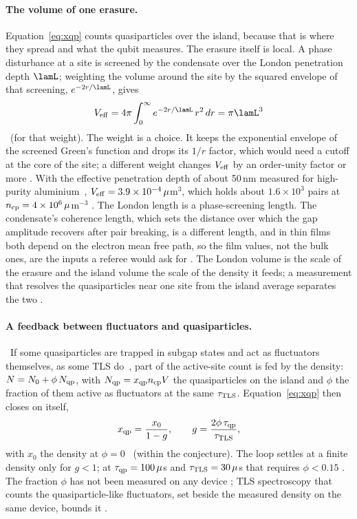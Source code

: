 \paragraph{The volume of one erasure.} Equation~\eqref{eq:xqp} counts quasiparticles over the island, because that is where they
spread and what the qubit measures. The erasure itself is local. A phase disturbance at a site is screened by the condensate over the
London penetration depth $\lamL$; weighting the volume around the site by the squared envelope of that screening, $e^{-2r/\lamL}$,
gives
\begin{equation}V_{\rm eff}=4\pi\int_0^\infty e^{-2r/\lamL}\,r^2\,dr=\pi\lamL^3\label{eq:xqp_veff}\end{equation}
\derived\ (for that weight). The weight is a choice. It keeps the exponential envelope of the screened Green's function and drops its
$1/r$ factor, which would need a cutoff at the core of the site; a different weight changes $V_{\rm eff}$ by an order-unity factor or
more \interp. With the effective penetration depth of about 50\,nm measured for high-purity aluminium~\cite{Ganjam2024},
$V_{\rm eff}=3.9\times10^{-4}\,\mu$m$^3$, which holds about $1.6\times10^{3}$ pairs at $n_{\rm cp}=4\times10^{6}\,\mu$m$^{-3}$ \calc. The
London length is a phase-screening length. The condensate's coherence length, which sets the distance over which the gap amplitude
recovers after pair breaking, is a different length, and in thin films both depend on the electron mean free path, so the film values,
not the bulk ones, are the inputs a referee would ask for \interp. The London volume is the scale of the erasure and the island volume the
scale of the density it feeds; a measurement that resolves the quasiparticles near one site from the island average separates the two
\openprob.

\paragraph{A feedback between fluctuators and quasiparticles.} \conjecture\ If some quasiparticles are trapped in subgap states and act as
fluctuators themselves, as some TLS do~\cite{deGraaf2020}, part of the active-site count is fed by the density: $N=N_0+\phi\,N_{\rm qp}$,
with $N_{\rm qp}=x_{\rm qp}n_{\rm cp}V$ the quasiparticles on the island and $\phi$ the fraction of them active as fluctuators at the
same $\tau_{\rm TLS}$. Equation~\eqref{eq:xqp} then closes on itself,
\begin{equation}x_{\rm qp}=\frac{x_0}{1-g},\qquad g=\frac{2\phi\,\tau_{\rm qp}}{\tau_{\rm TLS}},\label{eq:xqp_feedback}\end{equation}
with $x_0$ the density at $\phi=0$ \derived\ (within the conjecture). The loop settles at a finite density only for $g<1$; at
$\tau_{\rm qp}=100\,\mu$s and $\tau_{\rm TLS}=30\,\mu$s that requires $\phi<0.15$ \calc. The fraction $\phi$ has not been measured on any
device \openprob; TLS spectroscopy that counts the quasiparticle-like fluctuators, set beside the measured density on the same device,
bounds it \interp.

